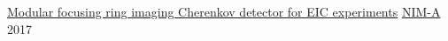 
\headedsection
{\href{http://inspirehep.net/record/1614745}{Modular focusing ring imaging Cherenkov detector for EIC experiments}}
{\textsc{\href{https://www.journals.elsevier.com/nuclear-instruments-and-methods-in-physics-research-section-a-accelerators-spectrometers-detectors-and-associated-equipment}{NIM-A}} 2017}{}